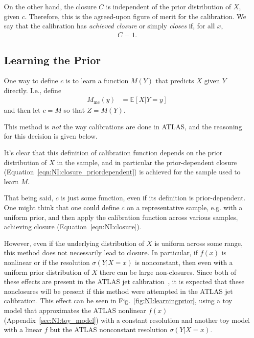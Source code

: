 On the other hand, the closure $C$ is independent of the prior distribution of $X$, given $c$.
Therefore, this is the agreed-upon figure of merit for the calibration.
We say that the calibration has {\it achieved closure} or simply {\it closes} if, for all $x$,
\begin{align}
C = 1.
\end{align}

\subsection{Learning the Prior}
\label{sec:NI:learningprior}
One way to define $c$ is to learn a function $M(Y)$ that predicts $X$ given $Y$ directly.
I.e., define
\begin{align}
M_\text{me}(y)&=\mathbb{E}[X|Y=y]
\end{align}
and then let $c=M$ so that $Z=M(Y)$.

This method is \emph{not} the way calibrations are done in ATLAS, and the reasoning for this decision is given below.

It's clear that this definition of calibration function depends on the prior distribution of $X$ in the sample, and in particular the prior-dependent closure (Equation~\ref{eqn:NI:closure_priordependent}) is achieved for the sample used to learn $M$.

That being said, $c$ is just some function, even if its definition is prior-dependent.
One might think that one could define $c$ on a representative sample, e.g. with a uniform prior, and then apply the calibration function across various samples, achieving closure (Equation~\ref{eqn:NI:closure}).

However, even if the underlying distribution of $X$ is uniform across some range, this method does not necessarily lead to closure.
In particular, if $f(x)$ is nonlinear or if the resolution $\sigma(Y|X=x)$ is nonconstant, then even with a uniform prior distribution of $X$ there can be large non-closures.
Since both of these effects are present in the ATLAS jet calibration~\cite{Aad:2011he}, it is expected that these nonclosures will be present if this method were attempted in the ATLAS jet calibration.
This effect can be seen in Fig.~\ref{fig:NI:learningprior}, using a toy model that approximates the ATLAS nonlinear $f(x)$ (Appendix~\ref{sec:NI:toy_model}) with a constant resolution and another toy model with a linear $f$ but the ATLAS nonconstant resolution $\sigma(Y|X=x)$.


